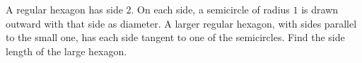 A regular hexagon has side $2$. On each side, a semicircle of radius $1$ is drawn outward with that side as diameter. A larger regular hexagon, with sides parallel to the small one, has each side tangent to one of the semicircles. Find the side length of the large hexagon.
